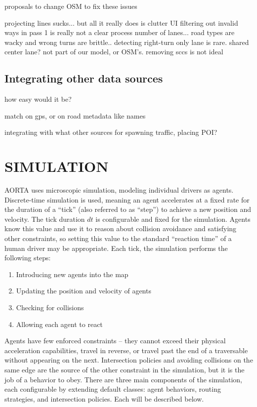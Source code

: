 \documentclass[letterpaper, 10 pt, conference]{ieeeconf}  %
\begin{document}
proposals to change OSM to fix these issues

projecting lines sucks... but all it really does is clutter UI
filtering out invalid ways in pass 1 is really not a clear process
number of lanes... road types are wacky and wrong
turns are brittle.. detecting right-turn only lane is rare. shared center lane?
  not part of our model, or OSM's.
removing sccs is not ideal

\subsection{Integrating other data sources}

how easy would it be?

match on gps, or on road metadata like names

integrating with what other sources for spawning traffic, placing POI?


\section{SIMULATION}

AORTA uses microscopic simulation, modeling individual drivers as agents.
Discrete-time simulation is used, meaning an agent accelerates at a fixed rate
for the duration of a ``tick'' (also referred to as ``step'') to achieve a new
position and velocity. The tick duration $dt$ is configurable and fixed for the
simulation. Agents know this value and use it to reason about collision
avoidance and satisfying other constraints, so setting this value to the
standard ``reaction time'' of a human driver may be appropriate. Each tick, the
simulation performs the following steps:

\begin{enumerate}
  \item Introducing new agents into the map
  \item Updating the position and velocity of agents
  \item Checking for collisions
  \item Allowing each agent to react
\end{enumerate}

Agents have few enforced constraints -- they cannot exceed their physical
acceleration capabilities, travel in reverse, or travel past the end of a
traversable without appearing on the next. Intersection policies and avoiding
collisions on the same edge are the source of the other constraint in the
simulation, but it is the job of a behavior to obey. There are three main
components of the simulation, each configurable by extending default classes:
agent behaviors, routing strategies, and intersection policies. Each will be
described below.
\end{document}
